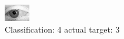 \begin{figure}[h!]
\begin{center}
\includegraphics[width=0.60\columnwidth]{figures/ID2849_class_4_target_3.png}
\end{center}
\caption{ Classification: 4 actual target: 3}
\label{fig:ID2849_class_4_target_3}
\end{figure}
